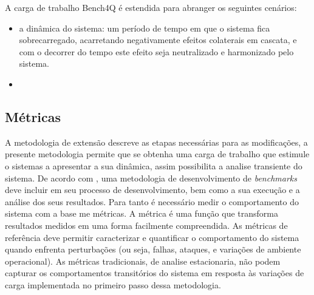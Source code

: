 

A carga de trabalho Bench4Q é estendida para abranger os seguintes cenários:
\begin{itemize}
	\item a dinâmica do sistema: um período de tempo em que o sistema fica sobrecarregado, acarretando negativamente efeitos colaterais em cascata, e com o decorrer do tempo este efeito seja neutralizado e harmonizado pelo sistema. %
	\item %
\end{itemize}


\subsection{Métricas}
A metodologia de extensão descreve as etapas necessárias para as modificações, a presente metodologia permite que se obtenha uma carga de trabalho que estimule o sistemas a apresentar a sua dinâmica, assim possibilita a analise transiente do sistema. De acordo com \cite{KaiSachs2010}, uma metodologia de desenvolvimento de \textit{benchmarks} deve incluir em seu processo de desenvolvimento, bem como a sua execução e a análise dos seus resultados. Para tanto é necessário medir o comportamento do sistema com a base me métricas. A métrica é uma função que transforma resultados medidos em uma forma facilmente compreendida. \cite{Folkerts2013} As métricas de referência deve permitir caracterizar e quantificar o comportamento do sistema quando enfrenta perturbações (ou seja, falhas, ataques, e variações de ambiente operacional).\cite{Marco2012} As métricas tradicionais, de analise estacionaria, não podem capturar os comportamentos transitórios do sistema em resposta às variações de carga implementada no primeiro passo dessa metodologia.

